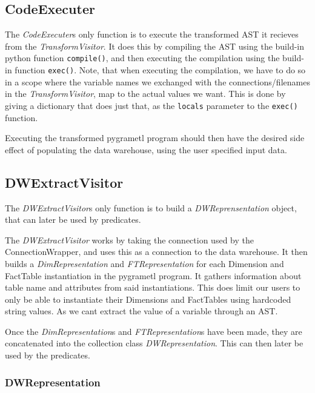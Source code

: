 \subsection{CodeExecuter}
The \textit{CodeExecuter}s only function is to execute the transformed AST it recieves from the \textit{TransformVisitor}. It does this by compiling the AST using the build-in python function \texttt{compile()}, and then executing the compilation using the build-in function \texttt{exec()}. Note, that when executing the compilation, we have to do so in a scope where the variable names we exchanged with the connections/filenames in the \textit{TransformVisitor}, map to the actual values we want. This is done by giving a dictionary that does just that, as the \texttt{locals} parameter to the \texttt{exec()} function.

Executing the transformed pygrametl program should then have the desired side effect of populating the data warehouse, using the user specified input data.

\subsection{DWExtractVisitor}
The \textit{DWExtractVisitor}s only function is to build a \textit{DWReprensentation} object, that can later be used by predicates.

The \textit{DWExtractVisitor} works by taking the connection used by the ConnectionWrapper, and uses this as a connection to the data warehouse. It then builds a \textit{DimRepresentation} and \textit{FTRepresentation} for each Dimension and FactTable instantiation in the pygrametl program. It gathers information about table name and attributes from said instantiations. This does limit our users to only be able to instantiate their Dimensions and FactTables using hardcoded string values. As we cant extract the value of a variable through an AST. 

Once the \textit{DimRepresentation}s and \textit{FTRepresentation}s have been made, they are concatenated into the collection class \textit{DWRepresentation}. This can then later be used by the predicates.

\subsubsection{DWRepresentation}
